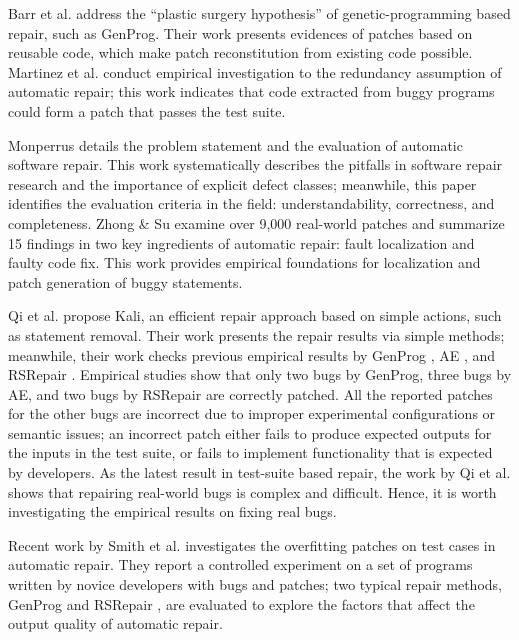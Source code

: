 Barr et al. \cite{DBLP:conf/sigsoft/BarrBDHS14} address the ``plastic surgery hypothesis'' of genetic-programming based repair, such as GenProg. Their work presents evidences of patches based on reusable code, which make patch reconstitution from existing code possible. Martinez et al. \cite{DBLP:conf/icse/MartinezWM14} conduct empirical investigation to the redundancy assumption of automatic repair; this work indicates that code extracted from buggy programs could form a patch that passes the test suite.  

Monperrus \cite{monperrus2014critical} details the problem statement and the evaluation of automatic software repair. This work systematically describes the pitfalls in software repair research and the importance of explicit defect classes; meanwhile, this paper identifies the evaluation criteria in the field: understandability, correctness, and completeness. 
Zhong \& Su \cite{zhong2015an} examine over 9,000 real-world patches and summarize 15 findings in two key ingredients of automatic repair: fault localization and faulty code fix. This work provides empirical foundations for localization and patch generation of buggy statements. 

Qi et al. \cite{qi2015efficient} propose Kali, an efficient repair approach based on simple actions, such as statement removal. Their work presents the repair results via simple methods; meanwhile, their work checks previous empirical results by GenProg \cite{le2012genprog}, AE \cite{DBLP:conf/kbse/WeimerFF13}, and RSRepair \cite{DBLP:conf/icsm/QiML13}. Empirical studies show that only two bugs by GenProg, three bugs by AE, and two bugs by RSRepair are correctly patched. All the reported patches for the other bugs are incorrect due to improper experimental configurations or semantic issues; an incorrect patch either fails to produce expected outputs for the inputs in the test suite, or fails to implement functionality that is expected by developers. 
As the latest result in test-suite based repair, the work by Qi et al. \cite{qi2015efficient} shows that repairing real-world bugs is complex and difficult. Hence, it is worth investigating the empirical results on fixing real bugs. 

Recent work by Smith et al. \cite{Smith15fse} investigates the overfitting patches on test cases in automatic repair. They report a controlled experiment on a set of programs written by novice developers with bugs and patches; two typical repair methods, GenProg \cite{le2012genprog} and RSRepair \cite{qi2014strength}, are evaluated to explore the factors that affect the output quality of automatic repair. 


